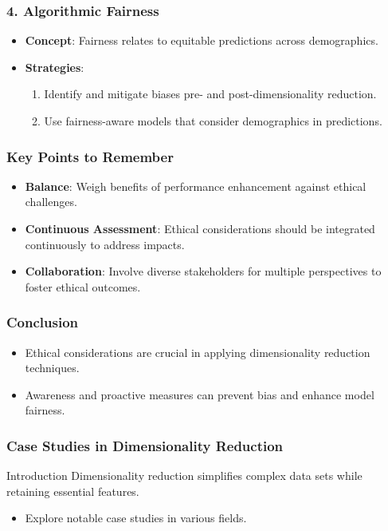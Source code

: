 \documentclass[aspectratio=169]{beamer}
\begin{document}
\begin{frame}[fragile]
    \frametitle{4. Algorithmic Fairness}
    \begin{itemize}
        \item \textbf{Concept}: Fairness relates to equitable predictions across demographics.
        \item \textbf{Strategies}:
        \begin{enumerate}
            \item Identify and mitigate biases pre- and post-dimensionality reduction.
            \item Use fairness-aware models that consider demographics in predictions.
        \end{enumerate}
    \end{itemize}
\end{frame}

\begin{frame}[fragile]
    \frametitle{Key Points to Remember}
    \begin{itemize}
        \item \textbf{Balance}: Weigh benefits of performance enhancement against ethical challenges.
        \item \textbf{Continuous Assessment}: Ethical considerations should be integrated continuously to address impacts.
        \item \textbf{Collaboration}: Involve diverse stakeholders for multiple perspectives to foster ethical outcomes.
    \end{itemize}
\end{frame}

\begin{frame}[fragile]
    \frametitle{Conclusion}
    \begin{itemize}
        \item Ethical considerations are crucial in applying dimensionality reduction techniques.
        \item Awareness and proactive measures can prevent bias and enhance model fairness.
    \end{itemize}
\end{frame}

\begin{frame}[fragile]
    \frametitle{Case Studies in Dimensionality Reduction}
    \begin{block}{Introduction}
        Dimensionality reduction simplifies complex data sets while retaining essential features.
    \end{block}
    \begin{itemize}
        \item Explore notable case studies in various fields.
    \end{itemize}
\end{frame}
\end{document}
